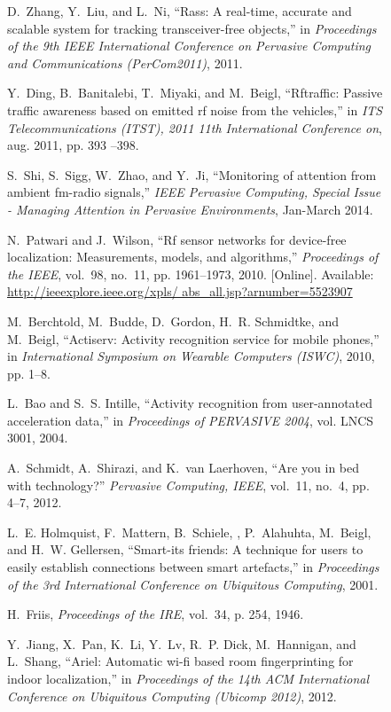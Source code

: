 \documentclass[journal]{IEEEtran}
\begin{document}
\begin{figure*}
\begin{thebibliography}{100}
D.~Zhang, Y.~Liu, and L.~Ni, ``Rass: A real-time, accurate and scalable system
  for tracking transceiver-free objects,'' in \emph{Proceedings of the 9th IEEE
  International Conference on Pervasive Computing and Communications
  (PerCom2011)}, 2011.

Y.~Ding, B.~Banitalebi, T.~Miyaki, and M.~Beigl, ``Rftraffic: Passive traffic
  awareness based on emitted rf noise from the vehicles,'' in \emph{ITS
  Telecommunications (ITST), 2011 11th International Conference on}, aug. 2011,
  pp. 393 --398.

S.~Shi, S.~Sigg, W.~Zhao, and Y.~Ji, ``Monitoring of attention from ambient
  fm-radio signals,'' \emph{IEEE Pervasive Computing, Special Issue - Managing
  Attention in Pervasive Environments}, Jan-March 2014.

\BIBentryALTinterwordspacing
N.~Patwari and J.~Wilson, ``Rf sensor networks for device-free localization:
  Measurements, models, and algorithms,'' \emph{Proceedings of the IEEE},
  vol.~98, no.~11, pp. 1961--1973, 2010. [Online]. Available:
  \url{http://ieeexplore.ieee.org/xpls/ abs\_all.jsp?arnumber=5523907}
\BIBentrySTDinterwordspacing

M.~Berchtold, M.~Budde, D.~Gordon, H.~R. Schmidtke, and M.~Beigl, ``Actiserv:
  Activity recognition service for mobile phones,'' in \emph{International
  Symposium on Wearable Computers (ISWC)}, 2010, pp. 1--8.

L.~Bao and S.~S. Intille, ``Activity recognition from user-annotated
  acceleration data,'' in \emph{Proceedings of PERVASIVE 2004}, vol. LNCS 3001,
  2004.

A.~Schmidt, A.~Shirazi, and K.~van Laerhoven, ``Are you in bed with
  technology?'' \emph{Pervasive Computing, IEEE}, vol.~11, no.~4, pp. 4--7,
  2012.

L.~E. Holmquist, F.~Mattern, B.~Schiele, , P.~Alahuhta, M.~Beigl, and H.~W.
  Gellersen, ``Smart-its friends: A technique for users to easily establish
  connections between smart artefacts,'' in \emph{Proceedings of the 3rd
  International Conference on Ubiquitous Computing}, 2001.

H.~Friis, \emph{Proceedings of the IRE}, vol.~34, p. 254, 1946.

Y.~Jiang, X.~Pan, K.~Li, Y.~Lv, R.~P. Dick, M.~Hannigan, and L.~Shang, ``Ariel:
  Automatic wi-fi based room fingerprinting for indoor localization,'' in
  \emph{Proceedings of the 14th ACM International Conference on Ubiquitous
  Computing (Ubicomp 2012)}, 2012.


\end{thebibliography}
\end{figure*}
\end{document}
